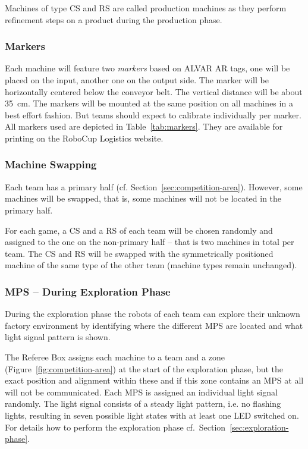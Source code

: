 \documentclass[12pt,twoside]{article}
\newcommand{\refsec}[1]{Section~\ref{#1}}
\newcommand{\reffig}[1]{Figure~\ref{#1}}
\newcommand{\reftab}[1]{Table~\ref{#1}}
\begin{document}
\noindent
Machines of type CS and RS are called production machines as they
perform refinement steps on a product during the production phase.

\subsubsection{Markers}
\label{sec:markers}
Each machine will feature two \emph{markers} based on ALVAR AR tags,
one will be placed on the input, another one on the output side. The
marker will be horizontally centered below the conveyor belt. The
vertical distance will be about \SI{35}{\centi\metre}. The markers
will be mounted at the same position on all machines in a best effort
fashion. But teams should expect to calibrate individually per
marker. All markers used are depicted in \reftab{tab:markers}. They
are available for printing on the RoboCup Logistics website.


\subsubsection{Machine Swapping}
\label{sec:machine-swapping}
Each team has a primary half
(cf. \refsec{sec:competition-area}). However, some machines will be
swapped, that is, some machines will not be located in the primary
half.

For each game, a CS and a RS of each team will be chosen randomly and
assigned to the one on the non-primary half -- that is two machines in
total per team. The CS and RS will be swapped with the symmetrically
positioned machine of the same type of the other team (machine types
remain unchanged).

\subsubsection{MPS -- During Exploration Phase}
\label{sec:production-machines-exp}
During the exploration phase the robots of each team can explore their
unknown factory environment by identifying where the different MPS are
located and what light signal pattern is shown.

The Referee Box assigns each machine to a team and a zone
(\reffig{fig:competition-area}) at the start of the exploration phase,
but the exact position and alignment within these and if this zone
contains an MPS at all will not be communicated. Each MPS is assigned
an individual light signal randomly. The light signal consists of a
steady light pattern, i.e. no flashing lights, resulting in seven
possible light states with at least one LED switched on. For details
how to perform the exploration phase
cf.~\refsec{sec:exploration-phase}.
\end{document}
